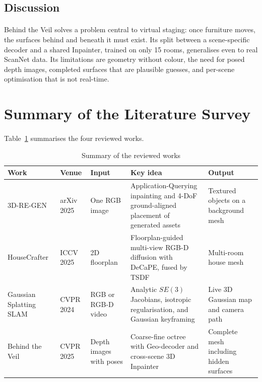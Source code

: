 \documentclass[12pt,a4paper,final]{extreport}
\begin{document}
\subsection{Discussion}

\paragraph{} Behind the Veil solves a problem central to virtual staging: once furniture moves, the surfaces behind and beneath it must exist. Its split between a scene-specific decoder and a shared Inpainter, trained on only 15 rooms, generalises even to real ScanNet data. Its limitations are geometry without colour, the need for posed depth images, completed surfaces that are plausible guesses, and per-scene optimisation that is not real-time.

\section{Summary of the Literature Survey}

\paragraph{} Table~\ref{tab:survey} summarises the four reviewed works.

{\renewcommand{\arraystretch}{1.15}
\begin{table}[htbp]
\centering
\caption{Summary of the reviewed works}\label{tab:survey}
\small
\begin{tabularx}{\textwidth}{|p{2.3cm}|p{1.6cm}|>{\raggedright\arraybackslash}p{2.2cm}|X|>{\raggedright\arraybackslash}p{2.6cm}|}
\hline
\textbf{Work} & \textbf{Venue} & \textbf{Input} & \textbf{Key idea} & \textbf{Output} \\ \hline
3D-RE-GEN \cite{p1} & arXiv 2025 & One RGB image & Application-Querying inpainting and 4-DoF ground-aligned placement of generated assets & Textured objects on a background mesh \\ \hline
HouseCrafter \cite{p2} & ICCV 2025 & 2D floorplan & Floorplan-guided multi-view RGB-D diffusion with DeCaPE, fused by TSDF & Multi-room house mesh \\ \hline
Gaussian Splatting SLAM \cite{p3} & CVPR 2024 & RGB or RGB-D video & Analytic $SE(3)$ Jacobians, isotropic regularisation, and Gaussian keyframing & Live 3D Gaussian map and camera path \\ \hline
Behind the Veil \cite{p4} & CVPR 2025 & Depth images with poses & Coarse-fine octree with Geo-decoder and cross-scene 3D Inpainter & Complete mesh including hidden surfaces \\ \hline
\end{tabularx}
\end{table}}
\end{document}
